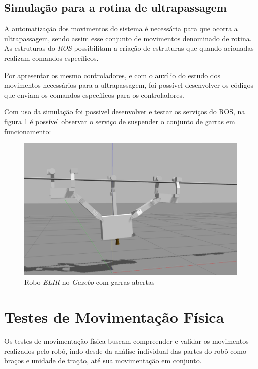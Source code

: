 \subsection{Simulação para a rotina de ultrapassagem}\label{sec:simu_ultr}
A automatização dos movimentos do sistema é necessária para que ocorra a ultrapassagem, sendo assim esse conjunto de movimentos denominado de rotina. As estruturas do \textit{ROS} possibilitam a criação de estruturas que quando acionadas realizam comandos específicos.

Por apresentar os mesmo controladores, e com o auxílio do estudo dos movimentos necessários para a ultrapassagem, foi possível desenvolver os códigos que enviam os comandos específicos para os controladores. 

Com uso da simulação foi possivel desenvolver e testar os serviços do ROS, na figura \ref{fig:simu_garras_abertas} é possível observar o serviço de suspender o conjunto de garras em funcionamento:

\begin{figure}[H]
	\centering
	\includegraphics[scale=0.25]{Figures/servico_simulacao_subirgarra.png}
	\caption{Robo \textit{ELIR} no \textit{Gazebo} com garras abertas}
	\label{fig:simu_garras_abertas}
\end{figure}

\section{Testes de Movimentação Física}\label{sec:test_mov}
Os testes de movimentação física buscam compreender e validar os movimentos realizados pelo robô, indo desde da análise individual das partes do robô como braços e unidade de tração, até sua movimentação em conjunto.

